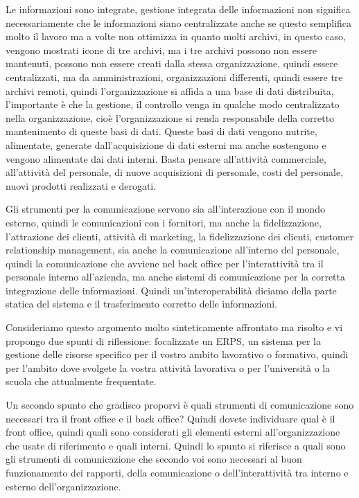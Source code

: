 Le informazioni sono integrate, gestione integrata delle informazioni non significa necessariamente che le informazioni siano centralizzate anche se questo semplifica molto il lavoro ma a volte non ottimizza in quanto molti archivi, in questo caso, vengono mostrati icone di tre archivi, ma i tre archivi possono non essere mantenuti, possono non essere creati dalla stessa organizzazione, quindi essere centralizzati, ma da amministrazioni, organizzazioni differenti, quindi essere tre archivi remoti, quindi l'organizzazione si affida a una base di dati distribuita, l'importante è che la gestione, il controllo venga in qualche modo centralizzato nella organizzazione, cioè l'organizzazione si renda responsabile della corretto mantenimento di queste basi di dati.
Queste basi di dati vengono nutrite, alimentate, generate dall'acquisizione di dati esterni ma anche sostengono e vengono alimentate dai dati interni.
Basta pensare all'attività commerciale, all'attività del personale, di nuove acquisizioni di personale, costi del personale, nuovi prodotti realizzati e derogati.

Gli strumenti per la comunicazione servono sia all'interazione con il mondo esterno, quindi le comunicazioni con i fornitori, ma anche la fidelizzazione, l'attrazione dei clienti, attività di marketing, la fidelizzazione dei clienti, customer relationship management, sia anche la comunicazione all'interno del personale, quindi la comunicazione che avviene nel back office per l'interattività tra il personale interno all'azienda, ma anche sistemi di comunicazione per la corretta integrazione delle informazioni.
Quindi un'interoperabilità diciamo della parte statica del sistema e il trasferimento corretto delle informazioni.

Consideriamo questo argomento molto sinteticamente affrontato ma risolto e vi propongo due spunti di riflessione: focalizzate un ERPS, un sistema per la gestione delle risorse specifico per il vostro ambito lavorativo o formativo, quindi per l'ambito dove svolgete la vostra attività lavorativa o per l'università o la scuola che attualmente frequentate.

Un secondo spunto che gradisco proporvi è quali strumenti di comunicazione sono necessari tra il front office e il back office?
Quindi dovete individuare qual è il front office, quindi quali sono considerati gli elementi esterni all'organizzazione che usate di riferimento e quali interni.
Quindi lo spunto si riferisce a quali sono gli strumenti di comunicazione che secondo voi sono necessari al buon funzionamento dei rapporti, della comunicazione o dell'interattività tra interno e esterno dell'organizzazione.

